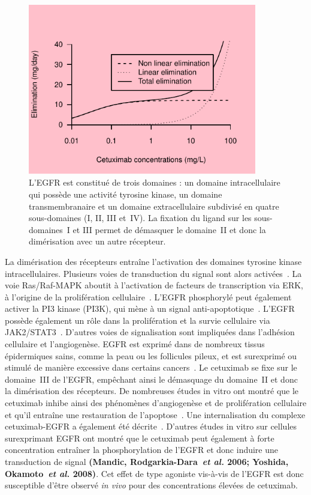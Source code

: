 \begin{figure}[htbp]
	\centering
		\includegraphics[width=10cm]{images/essai001.pdf}
	\caption[Structure de l'EGFR]{L'EGFR est constitué de trois domaines : un domaine intracellulaire qui possède une activité tyrosine kinase, un domaine transmembranaire et un domaine extracellulaire subdivisé en quatre sous-domaines (I, II, III et~IV). La fixation du ligand sur les sous-domaines~I et III permet de démasquer le domaine~II et donc la dimérisation avec un autre récepteur.}
	\label{fig:16}
\end{figure}

La dimérisation des récepteurs entraîne l'activation des domaines tyrosine kinase intracellulaires. Plusieurs voies de transduction du signal sont alors activées~\citep{REF98}. La voie Ras/Raf-MAPK aboutit à l'activation de facteurs de transcription via ERK, à l'origine de la prolifération cellulaire~\citep{REF99}. L'EGFR phosphorylé peut également activer la PI3 kinase (PI3K), qui mène à un signal anti-apoptotique~\citep{REF100}. L'EGFR possède également un rôle dans la prolifération et la survie cellulaire via JAK2/STAT3~\citep{REF101}. D'autres voies de signalisation sont impliquées dans l'adhésion cellulaire et l'angiogenèse. EGFR est exprimé dans de nombreux tissus épidermiques sains, comme la peau ou les follicules pileux, et est surexprimé ou stimulé de manière excessive dans certains cancers~\citep{REF102}.
Le cetuximab se fixe sur le domaine~III de l'EGFR, empêchant ainsi le démasquage du domaine~II et donc la dimérisation des récepteurs. De nombreuses études in vitro ont montré que le cetuximab inhibe ainsi des phénomènes d'angiogenèse et de prolifération cellulaire et qu'il entraîne une restauration de l'apoptose~\citep{REF103}. Une internalisation du complexe cetuximab-EGFR a également été décrite~\citep{REF43}. D'autres études in vitro sur cellules surexprimant EGFR ont montré que le cetuximab peut également à forte concentration entraîner la phosphorylation de l'EGFR et donc induire une transduction de signal \textbf{(Mandic, Rodgarkia-Dara~\textit{et al.} 2006; Yoshida, Okamoto~\textit{et al.} 2008)}. Cet effet de type agoniste vis-à-vis de l'EGFR est donc susceptible d'être observé \textit{in vivo} pour des concentrations élevées de cetuximab.

